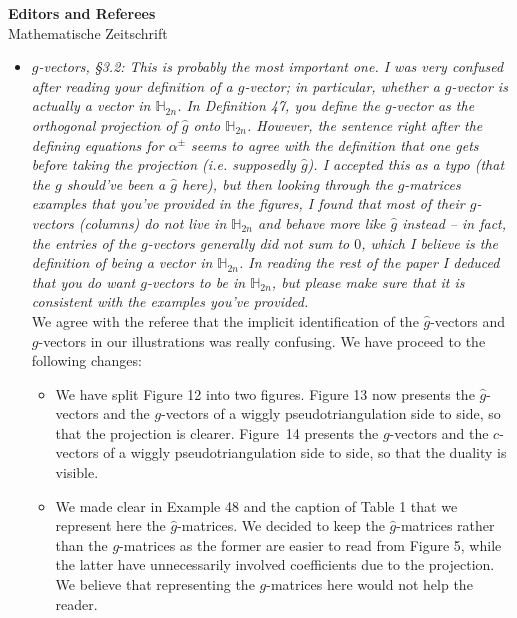 \documentclass{letter}
\begin{document}
\begin{letter}{{\bf Editors and Referees} \\ Mathematische Zeitschrift}
\begin{itemize}
\item \textsl{\color{gray} $g$-vectors, §3.2: This is probably the most important one. I was very confused after reading your definition of a $g$-vector; in particular, whether a $g$-vector is actually a vector in $\mathbb{H}_{2n}$. In Definition 47, you define the $g$-vector as the orthogonal projection of $\hat{g}$ onto $\mathbb{H}_{2n}$. However, the sentence right after the defining equations for $\alpha^\pm$ seems to agree with the definition that one gets before taking the projection (i.e. supposedly $\hat{g}$). I accepted this as a typo (that the $g$ should’ve been a $\hat{g}$ here), but then looking through the $g$-matrices examples that you’ve provided in the figures, I found that most of their $g$-vectors (columns) do not live in $\mathbb{H}_{2n}$ and behave more like $\hat{g}$ instead – in fact, the entries of the $g$-vectors generally did not sum to $0$, which I believe is the definition of being a vector in $\mathbb{H}_{2n}$. In reading the rest of the paper I deduced that you do want $g$-vectors to be in $\mathbb{H}_{2n}$, but please make sure that it is consistent with the examples you’ve provided.} \\
We agree with the referee that the implicit identification of the $\hat{g}$-vectors and $g$-vectors in our illustrations was really confusing. We have proceed to the following changes:
\begin{itemize}
\item We have split Figure 12 into two figures. Figure 13 now presents the $\hat{g}$-vectors and the \mbox{$g$-vectors} of a wiggly pseudotriangulation side to side, so that the projection is clearer. Figure~14 presents the $g$-vectors and the $c$-vectors of a wiggly pseudotriangulation side to side, so that the duality is visible.
\item We made clear in Example 48 and the caption of Table 1 that we represent here the $\hat{g}$-matrices. We decided to keep the $\hat{g}$-matrices rather than the $g$-matrices as the former are easier to read from Figure 5, while the latter have unnecessarily involved coefficients due to the projection. We believe that representing the $g$-matrices here would not help the reader.
\end{itemize}


\end{itemize}
\end{letter}
\end{document}
